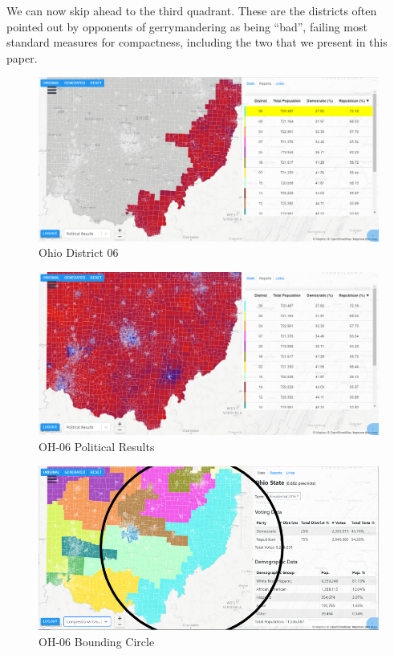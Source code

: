 \documentclass[letterpaper]{article}
\begin{document}
We can now skip ahead to the third quadrant. These are the districts often pointed out by opponents of gerrymandering as being “bad”, failing most standard measures for compactness, including the two that we present in this paper.

\begin{figure}[H]
	\includegraphics[width=\linewidth]{./figures/OH-06.png}
	\caption{Ohio District 06}
	\label{fig:oh06border}
\end{figure}

\begin{figure}[H]
	\includegraphics[width=\linewidth]{./figures/OH-06-SurroundingArea.png}
	\caption{OH-06 Political Results}
	\label{fig:oh06political}
\end{figure}

\begin{figure}[H]
	\includegraphics[width=\linewidth]{./figures/OH-06-BoundingCircle.png}
	\caption{OH-06 Bounding Circle}
	\label{fig:oh06boundingCircle}
\end{figure}
\end{document}

